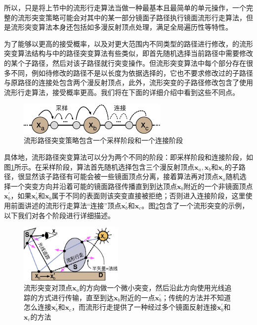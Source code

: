 所以，\cite{a:ManifoldExplorationAMarkovChainMonteCarloTechniqueforRenderingSceneswithDifficultSpecularTransport}只是将上节中的流形行走算法当做一种最基本且最简单的单元操作，一个完整的流形突变策略可能会对其中的某一部分镜面子路径执行镜面流形行走算法，但是流形突变算法本身还包括如多漫反射顶点处理，满足全局遍历性等特性。

为了能够以更高的接受概率，以及对更大范围内不同类型的路径进行修改，\cite{a:ManifoldExplorationAMarkovChainMonteCarloTechniqueforRenderingSceneswithDifficultSpecularTransport}的流形突变算法结构与\cite{a:MetropolisLightTransport}中的路径突变算法有些类似，即首先随机选择当前路径中需要修改的某个子路径，然后对该子路径就行突变操作。但流形突变算法中每个部分存在很多不同，例如待修改的路径不是以长度为依据选择的，它也不要求修改过的子路径与原路径的连接处包含两个漫反射顶点，此外，流形突变的子路径修改包含了使用流形行走算法，接受概率更高。我们将在下面的详细介绍中看到这些不同点。

\begin{figure}
	\sidecaption
	\includegraphics[width=0.65\textwidth]{figures/mlt/manifold-perturbation}
	\caption{流形路径突变策略包含一个采样阶段和一个连接阶段}
	\label{f:mlt-manifold-perturbation}
\end{figure}

具体地，流形路径突变算法可以分为两个不同的阶段：即采样阶段和连接阶段，如图\ref{f:mlt-manifold-perturbation}所示。在采样阶段，算法首先随机选择包含三个漫反射顶点$\mathbf{x}_a,\mathbf{x}_b$和$\mathbf{x}_c$的子路径，很显然该子路径有可能会被一些镜面顶点分离，接着算法再对顶点$\mathbf{x}_a$随机选择一个突变方向并沿着可能的镜面路径传播直到到达顶点$\mathbf{x}_b$附近的一个非镜面顶点$\mathbf{x}^{'}_b$，如果$\mathbf{x}^{'}_b$和$\mathbf{x}_b$属于不同的表面则该突变直接被拒绝；否则进入连接阶段，这里使用前面讲述的流形行走算法“连接”顶点$\mathbf{x}^{'}_b$和$\mathbf{x}_c$。图\ref{f:mlt-manifold-perturbation-example}包含了一个流形突变的示例，以下我们对各个阶段进行详细描述。

\begin{figure}
	\sidecaption
	\includegraphics[width=0.45\textwidth]{figures/mlt/manifold-perturbation-example}
	\caption{流形突变对顶点$\mathbf{x}_a$的方向做一个微小突变，然后沿此方向使用光线追踪的方式进行传输，直至到达$\mathbf{x}_b$附近的一点$\mathbf{x}^{'}_b$；传统的方法并不知道怎么连接$\mathbf{x}^{'}_b$和$\mathbf{x}_c$，而流形行走提供了一种经过多个镜面反射连接$\mathbf{x}^{'}_b$和$\mathbf{x}_c$的方法}
	\label{f:mlt-manifold-perturbation-example}
\end{figure}




